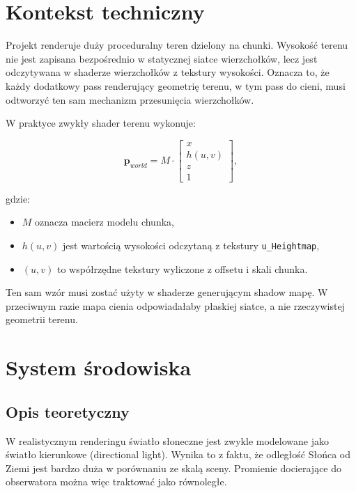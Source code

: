 \documentclass[12pt,a4paper]{article}
\begin{document}
\section{Kontekst techniczny}

Projekt renderuje duży proceduralny teren dzielony na chunki. Wysokość terenu nie jest zapisana bezpośrednio w statycznej siatce wierzchołków, lecz jest odczytywana w shaderze wierzchołków z tekstury wysokości. Oznacza to, że każdy dodatkowy pass renderujący geometrię terenu, w tym pass do cieni, musi odtworzyć ten sam mechanizm przesunięcia wierzchołków.

W praktyce zwykły shader terenu wykonuje:

\begin{equation}
    \mathbf{p}_{world} = M \cdot
    \begin{bmatrix}
    x \\
    h(u,v) \\
    z \\
    1
    \end{bmatrix},
\end{equation}

gdzie:

\begin{itemize}
    \item $M$ oznacza macierz modelu chunka,
    \item $h(u,v)$ jest wartością wysokości odczytaną z tekstury \texttt{u\_Heightmap},
    \item $(u,v)$ to współrzędne tekstury wyliczone z offsetu i skali chunka.
\end{itemize}

Ten sam wzór musi zostać użyty w shaderze generującym shadow mapę. W przeciwnym razie mapa cienia odpowiadałaby płaskiej siatce, a nie rzeczywistej geometrii terenu.

\section{System środowiska}

\subsection{Opis teoretyczny}

W realistycznym renderingu światło słoneczne jest zwykle modelowane jako światło kierunkowe (directional light). Wynika to z faktu, że odległość Słońca od Ziemi jest bardzo duża w porównaniu ze skalą sceny. Promienie docierające do obserwatora można więc traktować jako równoległe.
\end{document}
